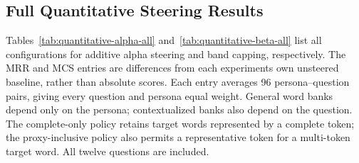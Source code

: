 \subsection{Full Quantitative Steering Results}
\label{sec:full-quantitative-results}
Tables~\ref{tab:quantitative-alpha-all} and~\ref{tab:quantitative-beta-all} list all configurations for additive alpha steering and band capping, respectively. The MRR and MCS entries are differences from each experiment\textquotesingle s own unsteered baseline, rather than absolute scores. Each entry averages 96 persona--question pairs, giving every question and persona equal weight. General word banks depend only on the persona; contextualized banks also depend on the question. The complete-only policy retains target words represented by a complete token; the proxy-inclusive policy also permits a representative token for a multi-token target word. All twelve questions are included.

